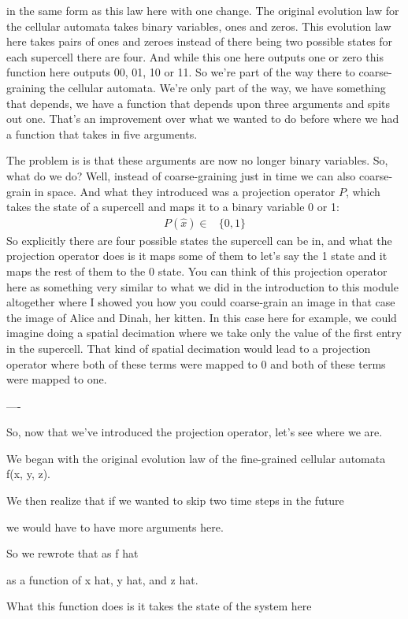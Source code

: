\documentclass[]{article}
\begin{document}
in the same form as this law here with one change.
The original evolution law for the cellular automata takes binary variables, ones and zeros.
This evolution law here takes pairs of ones and zeroes instead of there being two possible states for each supercell there are four.
And while this one here outputs one or zero
this function here outputs 00, 01, 10 or 11.
So we're part of the way there to coarse-graining the cellular automata.
We're only part of the way, we have something that depends, we have a function that depends upon three arguments and spits out one.
That's an improvement over what we wanted to do before where we had a function that takes in five arguments.

The problem is is that these arguments are now no longer binary variables.
So, what do we do? Well, instead of coarse-graining just in time we can also
coarse-grain in space.
And what they introduced was a projection operator $P$, which takes the state of a supercell and maps it to a binary variable 0 or 1:
\begin{align*}
	P(\hat{x}) \in& \{0,1\}
\end{align*}
So explicitly there are four possible states the supercell can be in,
and what the projection operator does is it maps some of them to let's say the 1 state and it maps the rest of them to the 0 state.
You can think of this projection operator here as something very similar to what we did in the introduction to this module altogether where I showed you how you could coarse-grain an image in that case the image of Alice and Dinah, her kitten.
In this case here for example, we could imagine doing a spatial decimation where we take only the value of the first entry in the supercell.
That kind of spatial decimation would lead to a projection operator where both of these terms were mapped to 0 and both of these terms were mapped to one.

----

So, now that we've introduced the projection operator,
let's see where we are.

We began with the original evolution law
of the fine-grained cellular automata f(x, y, z).

We then realize that if we wanted to skip
two time steps in the future

we would have to have more arguments here.

So we rewrote that as f hat

as a function of x hat, y hat, and z hat.

What this function does is it takes
the state of the system here
\end{document}

